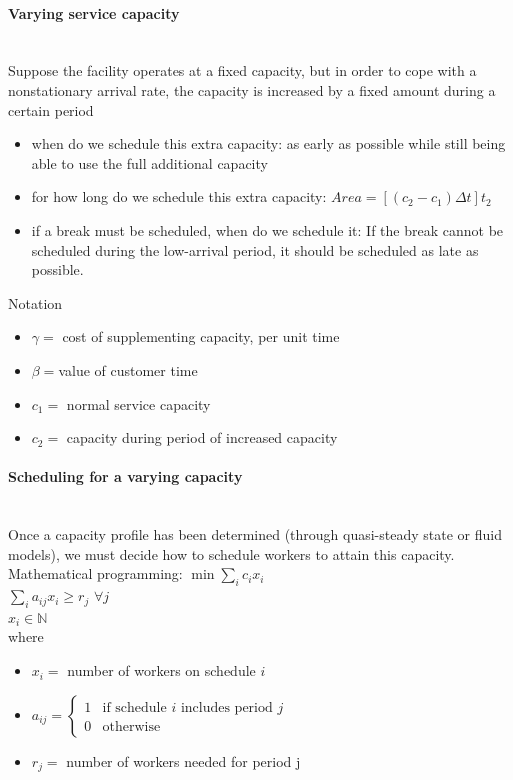 \documentclass[paper=a4,fontsize=8pt,pagesize,DIV=calc]{scrartcl}
\begin{document}
\begin{multicols}{3}
\paragraph{Varying service capacity} ~~\\
Suppose the facility operates at a fixed capacity, but in order to cope with a nonstationary arrival rate, the capacity is increased by a fixed amount during a certain period
\begin{itemize}
\item when do we schedule this extra capacity: as early as possible while still being able to use the full additional capacity
\item for how long do we schedule this extra capacity: $Area=[(c_2-c_1)\Delta t]t_2$
\item if a break must be scheduled, when do we schedule it: If the break cannot be scheduled during the low-arrival period, it should be scheduled as late as possible.
\end{itemize}
Notation
\begin{itemize}
\item $\gamma=$ cost of supplementing capacity, per unit time
\item $\beta=$value of customer time
\item $c_1 =$ normal service capacity
\item $c_2=$ capacity during period of increased capacity
\end{itemize}
\paragraph{Scheduling for a varying capacity}~~\\
Once a capacity profile has been determined (through quasi-steady state or fluid models), we must decide how to schedule workers to attain this capacity.
\\ Mathematical programming:
$\min \sum_i c_i x_i$
\\$\sum_i a_{ij}x_i\geq r_j$ $\forall j$
\\$x_i \in \mathbb{N}$
\\where
\begin{itemize}
\item $x_i =$ number of workers on schedule $i$
\item $a_{ij}=\begin{cases} 1 & \text{if schedule $i$ includes period $j$}\\0 & \text{otherwise} \end{cases}$
\item $r_j = $ number of workers needed for period j
\end{itemize}




\end{multicols}
\end{document}
